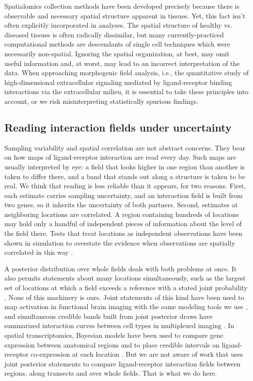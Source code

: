 \documentclass[10pt,letterpaper]{article}
\begin{document}
Spatialomics collection methods have been developed precisely because there is observable and necessary spatial structure apparent in tissues. Yet, this fact isn't often explicitly incorporated in analyses. The spatial structure of healthy vs. diseased tissues is often radically dissimilar, but many currently-practiced computational methods are descendants of single cell techniques which were necessarily non-spatial. Ignoring the spatial organization, at best, may omit useful information and, at worst, may lead to an incorrect interpretation of the data. When approaching morphogenic field analysis, i.e., the quantitative study of high-dimensional extracellular signaling mediated by ligand-receptor binding interactions via the extracellular milieu, it is essential to take these principles into account, or we risk misinterpreting statistically spurious findings.

\subsection*{Reading interaction fields under uncertainty}

Sampling variability and spatial correlation are not abstract concerns. They bear on how maps of ligand-receptor interaction are read every day. Such maps are usually interpreted by eye: a field that looks higher in one region than another is taken to differ there, and a band that stands out along a structure is taken to be real. We think that reading is less reliable than it appears, for two reasons. First, each estimate carries sampling uncertainty, and an interaction field is built from two genes, so it inherits the uncertainty of both partners. Second, estimates at neighboring locations are correlated. A region containing hundreds of locations may hold only a handful of independent pieces of information about the level of the field there. Tests that treat locations as independent observations have been shown in simulation to overstate the evidence when observations are spatially correlated in this way \cite{vasconcelos2026smide,seal2026spacebf}.

A posterior distribution over whole fields deals with both problems at once. It also permits statements about many locations simultaneously, such as the largest set of locations at which a field exceeds a reference with a stated joint probability \cite{bolin2015excursion}. None of this machinery is ours. Joint statements of this kind have been used to map activation in functional brain imaging with the same modeling tools we use \cite{mejia2020bayesian}, and simultaneous credible bands built from joint posterior draws have summarized interaction curves between cell types in multiplexed imaging \cite{eliason2026shade}. In spatial transcriptomics, Bayesian models have been used to compare gene expression between anatomical regions \cite{aijo2019splotch} and to place credible intervals on ligand-receptor co-expression at each location \cite{seal2026spacebf}. But we are not aware of work that uses joint posterior statements to compare ligand-receptor interaction fields between regions, along transects and over whole fields. That is what we do here.
\end{document}
